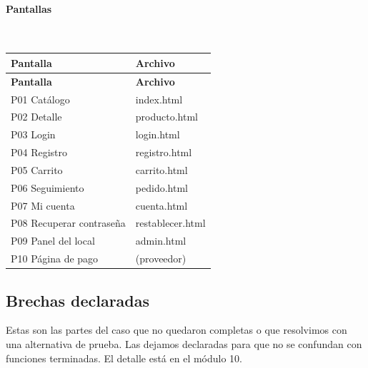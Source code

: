 \documentclass[10pt,letterpaper]{article}
\begin{document}
\paragraph{Pantallas}\mbox{}\\[2pt]
{\footnotesize
\begin{longtable}{|P{\tabcolsep\relax}|P{\tabcolsep\relax}|}
\hline
\textbf{Pantalla} & \textbf{Archivo} \\ \hline
\endfirsthead
\hline
\textbf{Pantalla} & \textbf{Archivo} \\ \hline
\endhead
P01 Catálogo & index.\allowbreak{}html \\ \hline
P02 Detalle & producto.\allowbreak{}html \\ \hline
P03 Login & login.\allowbreak{}html \\ \hline
P04 Registro & registro.\allowbreak{}html \\ \hline
P05 Carrito & carrito.\allowbreak{}html \\ \hline
P06 Seguimiento & pedido.\allowbreak{}html \\ \hline
P07 Mi cuenta & cuenta.\allowbreak{}html \\ \hline
P08 Recuperar contraseña & restablecer.\allowbreak{}html \\ \hline
P09 Panel del local & admin.\allowbreak{}html \\ \hline
P10 Página de pago & (proveedor) \\ \hline
\end{longtable}}

\subsection*{Brechas declaradas}
Estas son las partes del caso que no quedaron completas o que resolvimos con una alternativa de prueba. Las dejamos declaradas para que no se confundan con funciones terminadas. El detalle está en el módulo 10.
\end{document}
